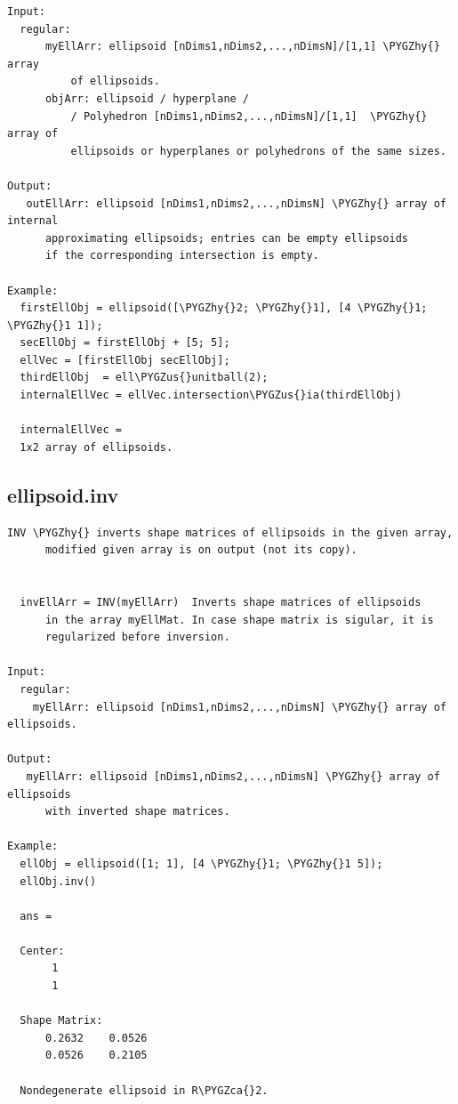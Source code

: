 \documentclass[letterpaper,10pt,english]{sphinxmanual}
\def\PYGZus{\char`\_}
\def\PYGZca{\char`\^}
\def\PYGZhy{\char`\-}
\begin{document}
\begin{Verbatim}[commandchars=\\\{\}]
Input:
  regular:
      myEllArr: ellipsoid [nDims1,nDims2,...,nDimsN]/[1,1] \PYGZhy{} array
          of ellipsoids.
      objArr: ellipsoid / hyperplane /
          / Polyhedron [nDims1,nDims2,...,nDimsN]/[1,1]  \PYGZhy{} array of
          ellipsoids or hyperplanes or polyhedrons of the same sizes.

Output:
   outEllArr: ellipsoid [nDims1,nDims2,...,nDimsN] \PYGZhy{} array of internal
      approximating ellipsoids; entries can be empty ellipsoids
      if the corresponding intersection is empty.

Example:
  firstEllObj = ellipsoid([\PYGZhy{}2; \PYGZhy{}1], [4 \PYGZhy{}1; \PYGZhy{}1 1]);
  secEllObj = firstEllObj + [5; 5];
  ellVec = [firstEllObj secEllObj];
  thirdEllObj  = ell\PYGZus{}unitball(2);
  internalEllVec = ellVec.intersection\PYGZus{}ia(thirdEllObj)

  internalEllVec =
  1x2 array of ellipsoids.
\end{Verbatim}


\subsection{ellipsoid.inv}
\label{chap_functions:ellipsoid-inv}
\begin{Verbatim}[commandchars=\\\{\}]
INV \PYGZhy{} inverts shape matrices of ellipsoids in the given array,
      modified given array is on output (not its copy).


  invEllArr = INV(myEllArr)  Inverts shape matrices of ellipsoids
      in the array myEllMat. In case shape matrix is sigular, it is
      regularized before inversion.

Input:
  regular:
    myEllArr: ellipsoid [nDims1,nDims2,...,nDimsN] \PYGZhy{} array of ellipsoids.

Output:
   myEllArr: ellipsoid [nDims1,nDims2,...,nDimsN] \PYGZhy{} array of ellipsoids
      with inverted shape matrices.

Example:
  ellObj = ellipsoid([1; 1], [4 \PYGZhy{}1; \PYGZhy{}1 5]);
  ellObj.inv()

  ans =

  Center:
       1
       1

  Shape Matrix:
      0.2632    0.0526
      0.0526    0.2105

  Nondegenerate ellipsoid in R\PYGZca{}2.
\end{Verbatim}
\end{document}
